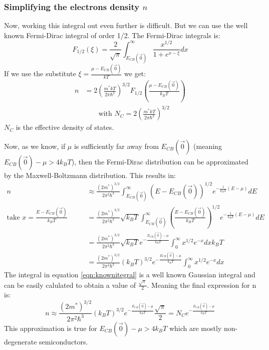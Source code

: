 \subsubsection{Simplifying the electrons density $n$}
Now, working this integral out even further is difficult. But we can use the well known Fermi-Dirac integral of order 1/2. The Fermi-Dirac integrals is:
\begin{equation}
	F_{1/2}(\xi) = \frac{2}{\sqrt{\pi}}\int_{E_{CB}(\vec{0})}^{\infty} \frac{x^{1/2}}{1 + e^{x-\xi}} dx
\end{equation}
If we use the substitute $\xi = \frac{\mu - E_{CB}(\vec{0})}{kT}$ we get:
\begin{align}
	n &= 2 \left(\frac{m^*kT}{2\pi\hbar^2}\right)^{3/2} F_{1/2}\left(\frac{\mu - E_{CB}(\vec{0})}{k_BT}\right) \\
	&\qquad \text{with } N_C = 2 \left(\frac{m^*kT}{2\pi\hbar^2}\right)^{3/2}
\end{align}
$N_C$ is the effective density of states. \\ \par
Now, as we know, if $\mu$ is sufficiently far away from $E_{CB}(\vec{0})$ (meaning $E_{CB}(\vec{0}) - \mu > 4k_BT$), then the Fermi-Dirac distribution can be approximated by the Maxwell-Boltzmann distribution. This results in:
\begin{align}
	n &\approx \frac{(2m^*)^{3/2}}{2\pi^2\hbar^3} \int_{E_{CB}(\vec{0})}^{\infty} (E-E_{CB}(\vec{0}))^{1/2} e^{-\frac{1}{k_BT}(E-\mu)} dE \\
	\text{take } x = \frac{E-E_{CB}(\vec{0})}{k_BT} \qquad &= \frac{(2m^*)^{3/2}}{2\pi^2\hbar^3} \sqrt{k_BT} \int_{E_{CB}(\vec{0})}^{\infty} \left(\frac{E-E_{CB}(\vec{0})}{k_BT}\right)^{1/2} e^{-\frac{1}{k_BT}(E-\mu)} dE \\
	&= \frac{(2m^*)^{3/2}}{2\pi^2\hbar^3} \sqrt{k_BT} e^{-\frac{E_{CB}(\vec{0})-\mu}{k_BT}} \int_{0}^{\infty} x^{1/2} e^{-x} dx k_BT \\
	&= \frac{(2m^*)^{3/2}}{2\pi^2\hbar^3} (k_BT)^{3/2} e^{-\frac{E_{CB}(\vec{0})-\mu}{k_BT}} \int_{0}^{\infty} x^{1/2} e^{-x} dx \label{eqn:knownitegral}
\end{align}
The integral in equation \ref{eqn:knownitegral} is a well known Gaussian integral and can be easily calulated to obtain a value of $\frac{\sqrt{\pi}}{2}$. Meaning the final expression for n is:
\begin{equation}
	n \approx \frac{(2m^*)^{3/2}}{2\pi^2\hbar^3} (k_BT)^{3/2} e^{-\frac{E_{CB}(\vec{0})-\mu}{k_BT}} \frac{\sqrt{\pi}}{2} = N_C e^{-\frac{E_{CB}(\vec{0})-\mu}{k_BT}}
\end{equation}
This approximation is true for $E_{CB}(\vec{0}) - \mu > 4k_BT$ which are mostly non-degenerate semiconductors.

